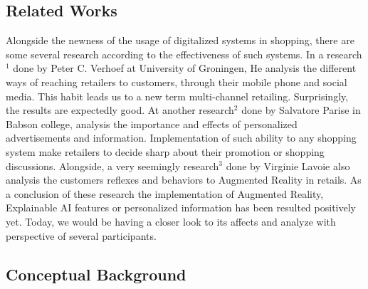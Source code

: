 \documentclass[letterpaper, 10 pt, conference]{ieeeconf}
\begin{document}
\subsection{Related Works}

Alongside the newness of the usage of digitalized systems in shopping, there are some several research according to the effectiveness of such systems. In a research$^1$ done by Peter C. Verhoef at University of Groningen, He analysis the different ways of reaching retailers to customers, through their mobile phone and social media. This habit leads us to a new term multi-channel retailing. Surprisingly, the results are expectedly good. At another research$^2$ done by Salvatore Parise in Babson college, analysis the importance and effects of personalized advertisements and information. Implementation of such ability to any shopping system make retailers to decide sharp about their promotion or shopping discussions. Alongside, a very seemingly research$^3$ done by Virginie Lavoie also analysis the customers reflexes and behaviors to Augmented Reality in retails. As a conclusion of these research the implementation of Augmented Reality, Explainable AI features or personalized information has been resulted positively yet. Today, we would be having a closer look to its affects and analyze with perspective of several participants.

\subsection{Conceptual Background}
\end{document}
